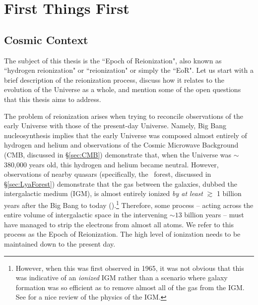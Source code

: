 


\ifpdf
    \graphicspath{{introduction/figures/PNG/}{introduction/figures/PDF/}{introduction/figures/}}
\else
    \graphicspath{{introduction/figures/EPS/}{introduction/figures/}}
\fi

\chapter{First Things First}
\section{Cosmic Context}\label{sec:CosmicContext}

The subject of this thesis is the ``Epoch of Reionization", also known as ``hydrogen reionization" or ``reionization" or simply the ``EoR". Let us start with a brief description of the reionization process, discuss how it relates to the evolution of the Universe as a whole, and mention some of the open questions that this thesis aims to address.


The problem of reionization arises when trying to reconcile observations of the early Universe with those of the present-day Universe. Namely, Big Bang nucleosynthesis implies that the early Universe was composed almost entirely of hydrogen and helium and observations of the Cosmic Microwave Background (CMB, discussed in \S \ref{sec:CMB}) demonstrate that, when the Universe was $\sim$380,000 years old, this hydrogen and helium became neutral. However, observations of nearby quasars (specifically, the \lya\ forest, discussed in \S \ref{sec:LyaForest}) demonstrate that the gas between the galaxies, dubbed the intergalactic medium (IGM), is almost entirely ionized \textit{by at least} $\gtrsim$ 1 billion years after the Big Bang to today (\citealt{1965ApJ...142.1633G}).\footnote{However, when this was first observed in 1965, it was not obvious that this was indicative of an \textit{ionized} IGM rather than a scenario where galaxy formation was so efficient as to remove almost all of the gas from the IGM. See \citet{meiksin2009physics} for a nice review of the physics of the IGM.} Therefore, some process -- acting across the entire volume of intergalactic space in the intervening $\sim13$ billion years -- must have managed to strip the electrons from almost all atoms. We refer to this process as the Epoch of Reionization. The high level of ionization needs to be maintained down to the present day. %


